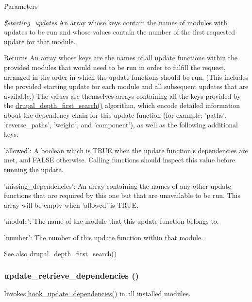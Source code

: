 \begin{DoxyParams}{Parameters}
\item[{\em \$starting\_\-updates}]An array whose keys contain the names of modules with updates to be run and whose values contain the number of the first requested update for that module.\end{DoxyParams}
\begin{DoxyReturn}{Returns}
An array whose keys are the names of all update functions within the provided modules that would need to be run in order to fulfill the request, arranged in the order in which the update functions should be run. (This includes the provided starting update for each module and all subsequent updates that are available.) The values are themselves arrays containing all the keys provided by the \hyperlink{graph_8inc_ab1e9257090d35212bd3dd3eba7706471}{drupal\_\-depth\_\-first\_\-search()} algorithm, which encode detailed information about the dependency chain for this update function (for example: 'paths', 'reverse\_\-paths', 'weight', and 'component'), as well as the following additional keys:
\begin{DoxyItemize}
\item 'allowed': A boolean which is TRUE when the update function's dependencies are met, and FALSE otherwise. Calling functions should inspect this value before running the update.
\item 'missing\_\-dependencies': An array containing the names of any other update functions that are required by this one but that are unavailable to be run. This array will be empty when 'allowed' is TRUE.
\item 'module': The name of the module that this update function belongs to.
\item 'number': The number of this update function within that module.
\end{DoxyItemize}
\end{DoxyReturn}
\begin{DoxySeeAlso}{See also}
\hyperlink{graph_8inc_ab1e9257090d35212bd3dd3eba7706471}{drupal\_\-depth\_\-first\_\-search()} 
\end{DoxySeeAlso}
\hypertarget{update_8inc_af82e7fa9b13df713eb110a4e782b0e69}{
\subsubsection[{update\_\-retrieve\_\-dependencies}]{\setlength{\rightskip}{0pt plus 5cm}update\_\-retrieve\_\-dependencies ()}}
\label{update_8inc_af82e7fa9b13df713eb110a4e782b0e69}
Invokes \hyperlink{group__hooks_ga23e9e019b7ec64d95bafbeaffd295483}{hook\_\-update\_\-dependencies()} in all installed modules.

